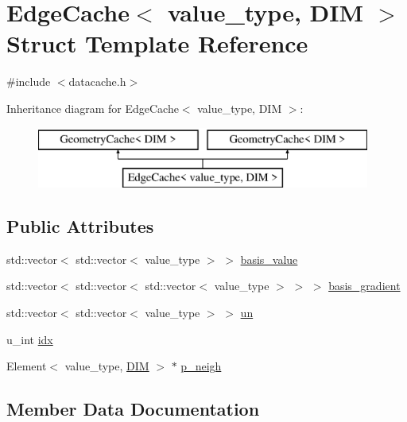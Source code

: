 \hypertarget{struct_edge_cache}{}\section{Edge\+Cache$<$ value\+\_\+type, D\+IM $>$ Struct Template Reference}
\label{struct_edge_cache}


{\ttfamily \#include $<$datacache.\+h$>$}

Inheritance diagram for Edge\+Cache$<$ value\+\_\+type, D\+IM $>$\+:\begin{figure}[H]
\begin{center}
\leavevmode
\includegraphics[height=2.000000cm]{struct_edge_cache}
\end{center}
\end{figure}
\subsection*{Public Attributes}
\begin{DoxyCompactItemize}
\item 
std\+::vector$<$ std\+::vector$<$ value\+\_\+type $>$ $>$ \mbox{\hyperlink{struct_edge_cache_a777fbadecd88c241148cfb65b30d2d2b}{basis\+\_\+value}}
\item 
std\+::vector$<$ std\+::vector$<$ std\+::vector$<$ value\+\_\+type $>$ $>$ $>$ \mbox{\hyperlink{struct_edge_cache_a2d4680a87cbdda58db97839bf250b809}{basis\+\_\+gradient}}
\item 
std\+::vector$<$ std\+::vector$<$ value\+\_\+type $>$ $>$ \mbox{\hyperlink{struct_edge_cache_a8c2a3c7fe9bb3530f6412b6c7b22d810}{un}}
\item 
u\+\_\+int \mbox{\hyperlink{struct_edge_cache_a41d2d7d840a282ed36366825d3d592b0}{idx}}
\item 
Element$<$ value\+\_\+type, \mbox{\hyperlink{complex__node___t_h_f_e_m_2uiexp_8h_a589b8b9bfdf714f736059845d568b597}{D\+IM}} $>$ $\ast$ \mbox{\hyperlink{struct_edge_cache_a35850c44237dee932b3dfa69d9a0d87d}{p\+\_\+neigh}}
\end{DoxyCompactItemize}


\subsection{Member Data Documentation}
\mbox{\label{struct_edge_cache_a2d4680a87cbdda58db97839bf250b809}} 
